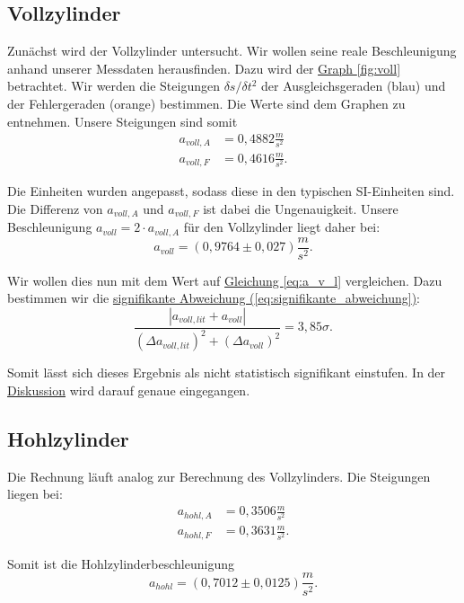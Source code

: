 \subsection*{Vollzylinder}
Zunächst wird der Vollzylinder untersucht. Wir wollen seine reale Beschleunigung anhand unserer Messdaten herausfinden. Dazu wird der \hyperref[fig:voll]{Graph \ref*{fig:voll}} betrachtet. Wir werden die Steigungen $\delta s/\delta t^2$ der Ausgleichsgeraden (blau) und der Fehlergeraden (orange) bestimmen. Die Werte sind dem Graphen zu entnehmen. Unsere Steigungen sind somit
\begin{align}
    a_{voll,A} &= 0,4882 \frac{m}{s^2}\\
    a_{voll,F} &= 0,4616 \frac{m}{s^2}.
\end{align}

Die Einheiten wurden angepasst, sodass diese in den typischen SI-Einheiten sind. Die Differenz von $a_{voll,A}$ und $a_{voll,F}$ ist dabei die Ungenauigkeit. Unsere Beschleunigung $a_{voll} = 2 \cdot a_{voll,A}$ für den Vollzylinder liegt daher bei:
\begin{equation}
    \boxed{
        a_{voll} = (0,9764 \pm 0,027) \frac{m}{s^2}
    }.
\end{equation}

Wir wollen dies nun mit dem Wert auf \hyperref[eq:a_v_l]{Gleichung \ref*{eq:a_v_l}} vergleichen. Dazu bestimmen wir die \hyperref[eq:signifikante_abweichung]{signifikante Abweichung (\ref*{eq:signifikante_abweichung})}:
\begin{equation}
    \frac{\left| a_{voll,lit} + a_{voll} \right|}{(\Delta a_{voll,lit})^2 + (\Delta a_{voll})^2} = 3,85\sigma.
\end{equation}

Somit lässt sich dieses Ergebnis als nicht statistisch signifikant einstufen. In der \hyperref[ch:diskussion]{Diskussion} wird darauf genaue eingegangen.

\subsection*{Hohlzylinder}
Die Rechnung läuft analog zur Berechnung des Vollzylinders. Die Steigungen liegen bei:
\begin{align}
    a_{hohl,A} &= 0,3506 \frac{m}{s^2} \\
    a_{hohl,F} &= 0,3631 \frac{m}{s^2}.
\end{align}

Somit ist die Hohlzylinderbeschleunigung
\begin{equation}
\boxed{
    a_{hohl} = (0,7012 \pm 0,0125) \frac{m}{s^2}
}.
\end{equation}

